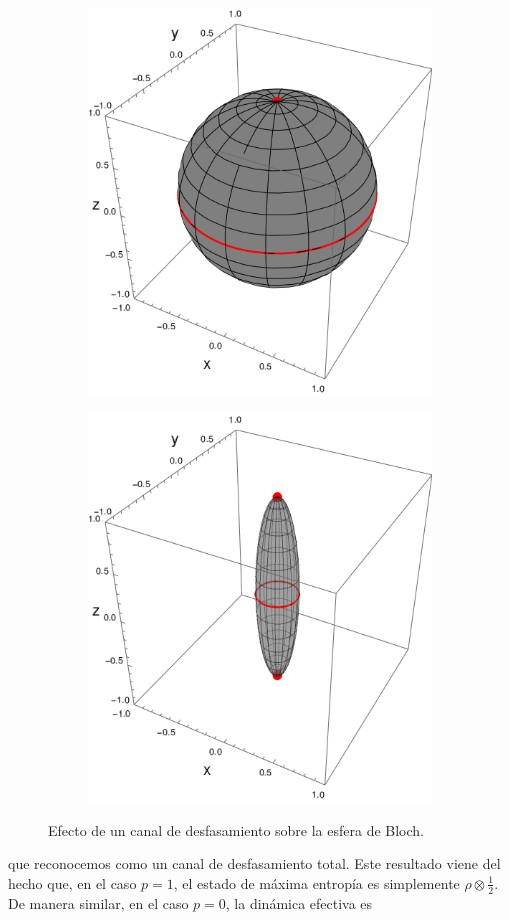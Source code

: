 \begin{figure}[ht!]
  \centering
  \begin{subfigure}{0.5\textwidth}
    \centering
    \includegraphics[width=0.6\linewidth]{chapter3/figures_toy/sphere_swapcontraction_t=0.0_z=0.9_p=0.9.png}
  \end{subfigure}%
  \begin{subfigure}{0.5\textwidth}
    \centering
    \includegraphics[width=0.6\linewidth]{chapter3/figures_toy/sphere_PF_t=1.0_z=0.8_p=0.6.png}
  \end{subfigure}
  \caption{Efecto de un canal de desfasamiento sobre la esfera de Bloch.}\label{fig:PhaseFlip}
\end{figure}
que reconocemos como un canal de desfasamiento total. Este resultado viene del hecho que, en el caso $p=1$, el estado de máxima entropía es simplemente $\rho\otimes\frac{1}{2}$. De manera similar, en el caso $p=0$, la dinámica efectiva es
